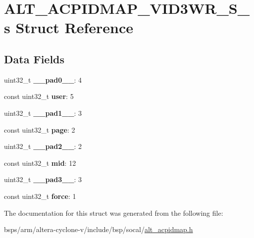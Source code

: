 \hypertarget{structALT__ACPIDMAP__VID3WR__S__s}{}\section{A\+L\+T\+\_\+\+A\+C\+P\+I\+D\+M\+A\+P\+\_\+\+V\+I\+D3\+W\+R\+\_\+\+S\+\_\+s Struct Reference}
\label{structALT__ACPIDMAP__VID3WR__S__s}
\subsection*{Data Fields}
\begin{DoxyCompactItemize}
\item 
\mbox{\label{structALT__ACPIDMAP__VID3WR__S__s_a72b02f70de9f0e051868fd9033a2989d}} 
uint32\+\_\+t {\bfseries \+\_\+\+\_\+pad0\+\_\+\+\_\+}\+: 4
\item 
\mbox{\label{structALT__ACPIDMAP__VID3WR__S__s_afcbaf8b1ed0a190d546a2b59a29e3333}} 
const uint32\+\_\+t {\bfseries user}\+: 5
\item 
\mbox{\label{structALT__ACPIDMAP__VID3WR__S__s_a5d07bb7ac0c5979ff4a1fa2ec8f9c55b}} 
uint32\+\_\+t {\bfseries \+\_\+\+\_\+pad1\+\_\+\+\_\+}\+: 3
\item 
\mbox{\label{structALT__ACPIDMAP__VID3WR__S__s_a433be936593e64dab82a7e2f8e742abf}} 
const uint32\+\_\+t {\bfseries page}\+: 2
\item 
\mbox{\label{structALT__ACPIDMAP__VID3WR__S__s_ae709e67e0e215ca3fa56b0526b4f0d17}} 
uint32\+\_\+t {\bfseries \+\_\+\+\_\+pad2\+\_\+\+\_\+}\+: 2
\item 
\mbox{\label{structALT__ACPIDMAP__VID3WR__S__s_af6902f3e56d8aa4053cefd2a6b1fbbda}} 
const uint32\+\_\+t {\bfseries mid}\+: 12
\item 
\mbox{\label{structALT__ACPIDMAP__VID3WR__S__s_a279c450657fe6ebcac175af595ef4139}} 
uint32\+\_\+t {\bfseries \+\_\+\+\_\+pad3\+\_\+\+\_\+}\+: 3
\item 
\mbox{\label{structALT__ACPIDMAP__VID3WR__S__s_ace832a3032102642dfd55ce956e9aab8}} 
const uint32\+\_\+t {\bfseries force}\+: 1
\end{DoxyCompactItemize}


The documentation for this struct was generated from the following file\+:\begin{DoxyCompactItemize}
\item 
bsps/arm/altera-\/cyclone-\/v/include/bsp/socal/\mbox{\hyperlink{alt__acpidmap_8h}{alt\+\_\+acpidmap.\+h}}\end{DoxyCompactItemize}

